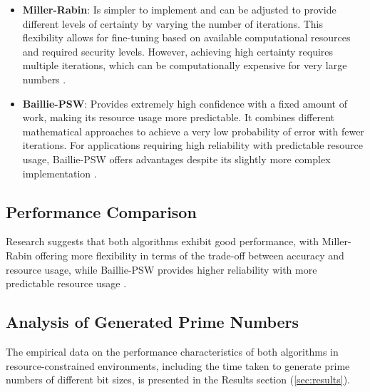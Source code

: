 \begin{itemize}
    \item \textbf{Miller-Rabin}: Is simpler to implement and can be adjusted to provide different levels of certainty by varying the number of iterations. This flexibility allows for fine-tuning based on available computational resources and required security levels. However, achieving high certainty requires multiple iterations, which can be computationally expensive for very large numbers \cite{taxonomy_primality}.
    
    \item \textbf{Baillie-PSW}: Provides extremely high confidence with a fixed amount of work, making its resource usage more predictable. It combines different mathematical approaches to achieve a very low probability of error with fewer iterations. For applications requiring high reliability with predictable resource usage, Baillie-PSW offers advantages despite its slightly more complex implementation \cite{hardware_baillie}.
\end{itemize}

\subsection{Performance Comparison}

Research suggests that both algorithms exhibit good performance, with Miller-Rabin offering more flexibility in terms of the trade-off between accuracy and resource usage, while Baillie-PSW provides higher reliability with more predictable resource usage \cite{taxonomy_primality}.

\subsection{Analysis of Generated Prime Numbers}

The empirical data on the performance characteristics of both algorithms in resource-constrained environments, including the time taken to generate prime numbers of different bit sizes, is presented in the Results section (\autoref{sec:results}). 